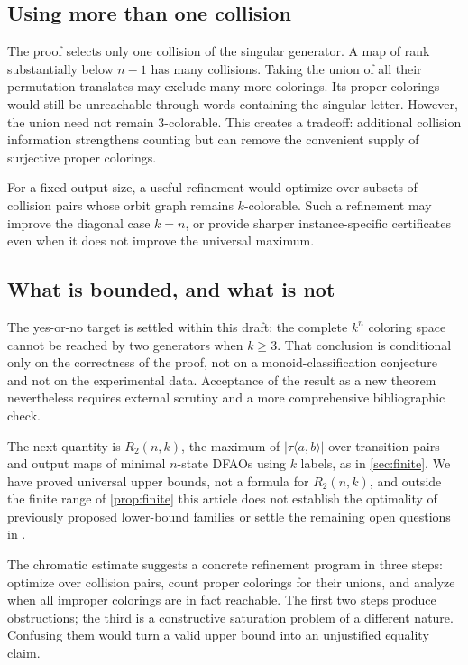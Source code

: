 \documentclass[11pt,a4paper]{article}
\numberwithin{equation}{section}
\theoremstyle{definition}
\theoremstyle{remark}
\begin{document}
\subsection{Using more than one collision}

The proof selects only one collision of the singular generator. A map of
rank substantially below $n-1$ has many collisions. Taking the union of all
their permutation translates may exclude many more colorings. Its proper
colorings would still be unreachable through words containing the singular
letter. However, the union need not remain $3$-colorable. This creates a
tradeoff: additional collision information strengthens counting but can
remove the convenient supply of surjective proper colorings.

For a fixed output size, a useful refinement would optimize over subsets of
collision pairs whose orbit graph remains $k$-colorable. Such a refinement
may improve the diagonal case $k=n$, or provide sharper instance-specific
certificates even when it does not improve the universal maximum.

\subsection{What is bounded, and what is not}

The yes-or-no target is settled within this draft: the complete $k^n$
coloring space cannot be reached by two generators when $k\ge3$. That
conclusion is conditional only on the correctness of the proof, not on a
monoid-classification conjecture and not on the experimental data. Acceptance
of the result as a new theorem nevertheless requires external scrutiny and a
more comprehensive bibliographic check.

The next quantity is $R_2(n,k)$, the maximum of $|\tau\langle a,b\rangle|$
over transition pairs and output maps of minimal $n$-state DFAOs using $k$
labels, as in \cref{sec:finite}. We have proved universal upper bounds, not a
formula for $R_2(n,k)$, and outside the finite range of \cref{prop:finite}
this article does not establish the optimality of previously proposed
lower-bound families or settle the remaining open questions in
\cite[Section~5]{Davies2017}.

The chromatic estimate suggests a concrete refinement program in three
steps: optimize over collision pairs, count proper colorings for their
unions, and analyze when all improper colorings are in fact reachable. The
first two steps produce obstructions; the third is a constructive saturation
problem of a different nature. Confusing them would turn a valid upper bound
into an unjustified equality claim.
\end{document}
